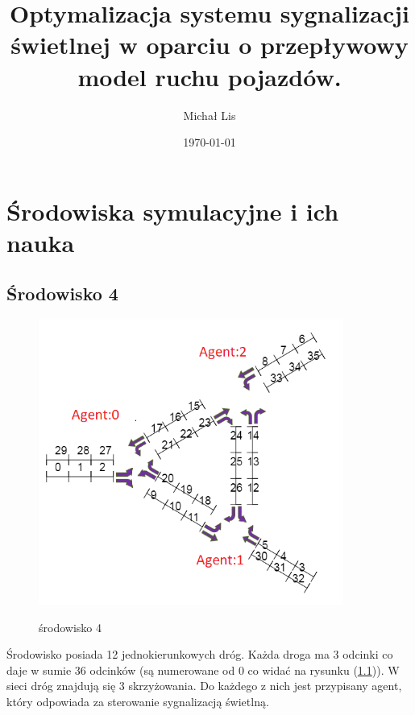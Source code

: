 \documentclass[12pt]{book}
\theoremstyle{plain}
\let\oldref\ref
\renewcommand{\ref}[1]{(\oldref{#1})}
\begin{document}
	\title{Optymalizacja  systemu sygnalizacji świetlnej w 
		oparciu o przepływowy model ruchu pojazdów.}
	\author{Michał Lis}
	\date{\today}
	\maketitle
	\tableofcontents
	
	\chapter {Środowiska symulacyjne i ich nauka}
	\section{Środowisko 4}
	\begin{figure}[H]
		\centering
		\includegraphics[width=10cm]{env_4_agenci}
		\label{fig:env_4_agenci}
		\caption{środowisko 4}
	\end{figure}
	
	Środowisko posiada 12 jednokierunkowych dróg. Każda droga ma 3 odcinki co daje w sumie 36 odcinków (są numerowane od 0 co widać na rysunku \ref{fig:env_4_agenci}).
	W sieci dróg znajdują się 3 skrzyżowania. Do każdego z nich jest przypisany agent, który odpowiada za sterowanie sygnalizacją świetlną.
	
\end{document}
